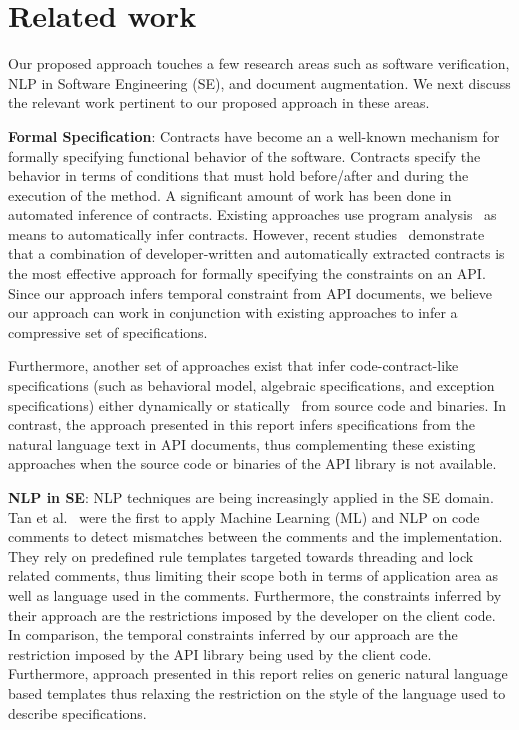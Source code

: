 \section{Related work}
\label{sec:related}

Our proposed approach touches a few research areas such as software verification, NLP in Software Engineering (SE), and document augmentation.
We next discuss the relevant work pertinent to our proposed approach in these areas.

\textbf{Formal Specification}:
Contracts have become an a well-known mechanism for formally specifying functional behavior of the software. 
Contracts specify the behavior in terms of conditions that must hold before/after and during the execution of the method.
A significant amount of work has been done in automated inference of contracts.
Existing approaches use program analysis~\cite{csallner08dysy,NimmerE02:ISSTA,Tillmann:2006:DLM:2105385.2105433}
as means to automatically infer contracts.
However, recent studies~\cite{Polikarpova2009ISSTA,Flanagan2001:HAA} demonstrate that a combination of developer-written and automatically extracted
contracts is the most effective approach for formally specifying the constraints on an API.
Since  our approach infers temporal constraint from API documents, we believe our approach can work in conjunction with existing approaches
to infer a compressive set of specifications.
  
Furthermore, another set of approaches exist that infer code-contract-like specifications (such as behavioral model, algebraic specifications, and exception specifications) either dynamically\cite{Henkel07discoveringdocumentation,Ghezzi:2009:SIB:1555001.1555057,Henkel:2008:DDA:1363102.1363105} or statically~\cite{Flanagan2001:HAA,Buse:2008:ADI:1390630.1390664} from source code and binaries. In contrast, the approach presented in this report infers specifications from the natural language text in API documents,
thus complementing these existing approaches when the source code or binaries of the API library is not available.


\textbf{NLP in SE}:
NLP techniques are being increasingly applied in the SE domain. 
Tan et al.~\cite{TanSOSP07} were the first to apply Machine Learning (ML) and NLP on code comments to detect mismatches between the comments and the implementation.
They rely on predefined rule templates targeted towards threading and lock related comments, thus limiting their scope both in terms of application area as well as language used in the comments.
Furthermore, the constraints inferred by their approach are the restrictions imposed by the developer on the client code.
In comparison, the temporal constraints inferred by our approach are the restriction imposed by the API library being used by the client code.
Furthermore, approach presented in this report relies on generic natural language based templates thus relaxing the restriction on the style of the language used to describe specifications.

